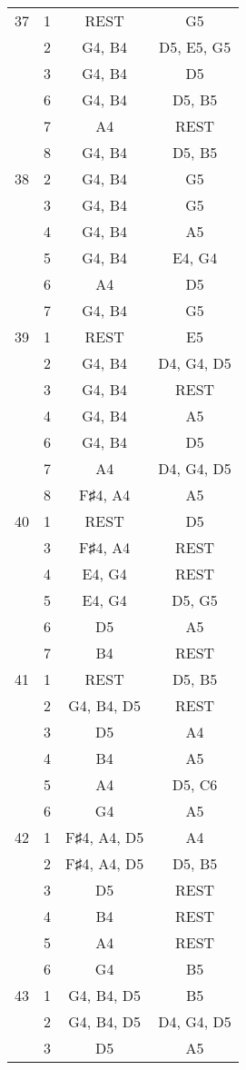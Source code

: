 \documentclass{article}
\begin{document}
\begin{longtable}{|c|c|c|c|}
\hline
37 & 1 & REST & G5 \\ 
  & 2 & G4, B4 & D5, E5, G5 \\ 
  & 3 & G4, B4 & D5 \\ 
  & 6 & G4, B4 & D5, B5 \\ 
  & 7 & A4 & REST \\ 
  & 8 & G4, B4 & D5, B5 \\ 
\hline
38 & 2 & G4, B4 & G5 \\ 
  & 3 & G4, B4 & G5 \\ 
  & 4 & G4, B4 & A5 \\ 
  & 5 & G4, B4 & E4, G4 \\ 
  & 6 & A4 & D5 \\ 
  & 7 & G4, B4 & G5 \\ 
\hline
39 & 1 & REST & E5 \\ 
  & 2 & G4, B4 & D4, G4, D5 \\ 
  & 3 & G4, B4 & REST \\ 
  & 4 & G4, B4 & A5 \\ 
  & 6 & G4, B4 & D5 \\ 
  & 7 & A4 & D4, G4, D5 \\ 
  & 8 & F♯4, A4 & A5 \\ 
\hline
40 & 1 & REST & D5 \\ 
  & 3 & F♯4, A4 & REST \\ 
  & 4 & E4, G4 & REST \\ 
  & 5 & E4, G4 & D5, G5 \\ 
  & 6 & D5 & A5 \\ 
  & 7 & B4 & REST \\ 
\hline
41 & 1 & REST & D5, B5 \\ 
  & 2 & G4, B4, D5 & REST \\ 
  & 3 & D5 & A4 \\ 
  & 4 & B4 & A5 \\ 
  & 5 & A4 & D5, C6 \\ 
  & 6 & G4 & A5 \\ 
\hline
42 & 1 & F♯4, A4, D5 & A4 \\ 
  & 2 & F♯4, A4, D5 & D5, B5 \\ 
  & 3 & D5 & REST \\ 
  & 4 & B4 & REST \\ 
  & 5 & A4 & REST \\ 
  & 6 & G4 & B5 \\ 
\hline
43 & 1 & G4, B4, D5 & B5 \\ 
  & 2 & G4, B4, D5 & D4, G4, D5 \\ 
  & 3 & D5 & A5 \\ 

\end{longtable}
\end{document}
